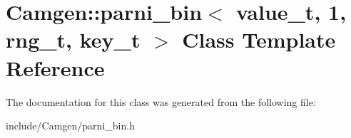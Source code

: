 \hypertarget{a00391}{}\section{Camgen\+:\+:parni\+\_\+bin$<$ value\+\_\+t, 1, rng\+\_\+t, key\+\_\+t $>$ Class Template Reference}
\label{a00391}


The documentation for this class was generated from the following file\+:\begin{DoxyCompactItemize}
\item 
include/\+Camgen/parni\+\_\+bin.\+h\end{DoxyCompactItemize}
